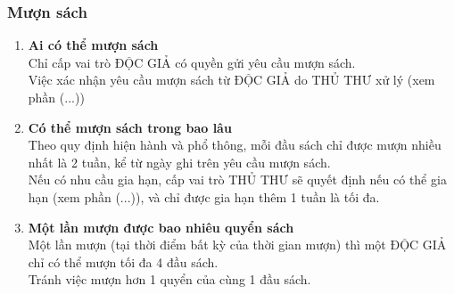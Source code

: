 \documentclass[12pt,a4paper]{report}
\begin{document}
			\subsubsection{Mượn sách}
				\begin{enumerate}
				\item \textbf{Ai có thể mượn sách}\\
				Chỉ cấp vai trò ĐỘC GIẢ có quyền gửi yêu cầu mượn sách.\\
				Việc xác nhận yêu cầu mượn sách từ ĐỘC GIẢ do THỦ THƯ xử lý (xem phần (...))\\
				\item \textbf{Có thể mượn sách trong bao lâu}\\
				Theo quy định hiện hành và phổ thông, mỗi đầu sách chỉ được mượn nhiều nhất là 2 tuần, kể từ ngày ghi trên yêu cầu mượn sách.\\
				Nếu có nhu cầu gia hạn, cấp vai trò THỦ THƯ sẽ quyết định nếu có thể gia hạn (xem phần (...)), và chỉ được gia hạn thêm 1 tuần là tối đa.\\
				\item \textbf{Một lần mượn được bao nhiêu quyển sách}\\
				Một lần mượn (tại thời điểm bất kỳ của thời gian mượn) thì một ĐỘC GIẢ chỉ có thể mượn tối đa 4 đầu sách.\\
				Tránh việc mượn hơn 1 quyển của cùng 1 đầu sách.\\
				\end{enumerate}
\end{document}
